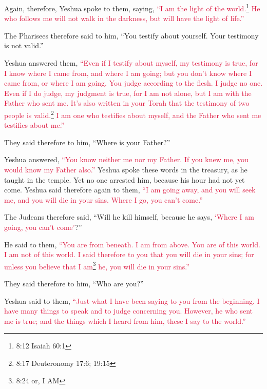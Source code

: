 \myverse{}Again, therefore, Yeshua spoke to them, saying,
\textcolor{crimson}{“I am the light of the world.}\footnote{8:12 Isaiah 60:1}
\textcolor{crimson}{He who follows me will not walk in the darkness, but will have the light of life.”}

\myverse{}The Pharisees therefore said to him, “You testify about yourself.
Your testimony is not valid.”

\myverse{}Yeshua answered them,
\textcolor{crimson}{“Even if I testify about myself, my testimony is true, for I know where I came from, and where I am
	going; but you don’t know where I came from, or where I am going.
}
\myverse{}\textcolor{crimson}{You judge according to the flesh. I judge no one.
}
\myverse{}\textcolor{crimson}{Even if I do judge, my judgment is true, for I am not alone, but I am
	with the Father who sent me.
}
\myverse{}\textcolor{crimson}{It’s also written in your Torah that the testimony of two people is valid.}\footnote{8:17 Deuteronomy 17:6;
	19:15}
\myverse{}\textcolor{crimson}{I am one who testifies about myself, and the Father who sent me testifies
	about me.”}

\myverse{}They said therefore to him, “Where is your Father?”

Yeshua answered,
\textcolor{crimson}{“You know neither me nor my Father. If you knew me, you would know my Father also.”}
\myverse{}Yeshua spoke these words in the treasury, as he taught in the temple. Yet
no one arrested him, because his hour had not yet come.
\myverse{}Yeshua said therefore again to them,
\textcolor{crimson}{“I am going away, and you will seek me, and you will die in your sins. Where I go, you can’t come.”
}

\myverse{}The Judeans therefore said, “Will he kill himself, because he
says,
\textcolor{crimson}{‘Where I am going, you can’t come’}?”

\myverse{}He said to them,
\textcolor{crimson}{“You are from beneath. I am from above. You are of this world. I am not of this world.
}
\myverse{}\textcolor{crimson}{I said therefore to you that you will die in your sins; for unless you
	believe that I am}\footnote{8:24 or, I AM}
\textcolor{crimson}{he, you will die in your sins.”
}

\myverse{}They said therefore to him, “Who are you?”

Yeshua said to them,
\textcolor{crimson}{“Just what I have been saying to you from the beginning.
}
\myverse{}\textcolor{crimson}{I have many things to speak and to judge concerning you. However, he who
	sent me is true; and the things which I heard from him, these I say to the world.”}


